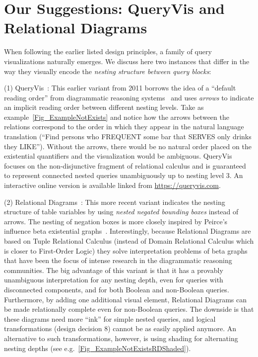 \documentclass[letterpaper,11pt]{article}
\newcommand{\queryvis}{\textsf{QueryVis}\xspace}
\newcommand{\diagrams}{\textsf{Relational Diagrams}\xspace}
\begin{document}
%
\section{Our Suggestions: \queryvis and \diagrams}

When following the earlier listed design principles, a family of query visualizations naturally emerges.
%
We discuss here two instances that differ in the way they visually encode the \emph{nesting structure between query blocks}:

(1) \queryvis~\cite{DanaparamitaG2011:QueryViz,
gatterbauer2011databases,
DBLP:conf/sigmod/LeventidisZDGJR20}:
This earlier variant from 2011
%
%
%
borrows the idea of a ``default reading order''
from diagrammatic reasoning systems~\cite{DBLP:conf/diagrams/FishH04} 
and uses \emph{arrows} to indicate an implicit reading order between different nesting levels.
Take as example~\autoref{Fig_ExampleNotExists} and notice how the arrows between the relations correspond to the order in which 
they appear in the natural language translation
(``Find persons who FREQUENT some bar that SERVES only drinks they LIKE''). 
Without the arrows, there would be no natural order placed on the existential quantifiers 
and the visualization would be ambiguous.
\queryvis focuses on the non-disjunctive fragment of relational calculus and is guaranteed to represent connected nested queries unambiguously up to nesting level 3.
An interactive online version is available linked from \url{https://queryvis.com}.



(2) \diagrams~\cite{relationalDiagrams}:
This more recent variant indicates the nesting structure of table variables by using \emph{nested negated bounding boxes} instead of arrows.
The nesting of negation boxes is more closely inspired by Peirce's influence beta existential graphs~\cite{peirce:1933,Roberts:1992,Shin:2002}.
%
%
Interestingly, because \diagrams are based on Tuple Relational Calculus (instead of Domain Relational Calculus which is closer to First-Order Logic)
they solve interpretation problems of beta graphs that have been the focus of intense research in the diagrammatic reasoning communities.
The big advantage of this variant is that it has a provably unambiguous interpretation for any nesting depth, 
even for queries with disconnected components,
and for both Boolean and non-Boolean queries.
Furthermore, by adding one additional visual element, \diagrams can be made relationally complete even for non-Boolean queries.
The downside is that these diagrams need more ``ink'' for simple nested queries, 
and logical transformations (design decision 8) cannot be as easily applied anymore.
An alternative to such transformations, however, is using shading for alternating nesting depths
(see e.g.\ \autoref{Fig_ExampleNotExistsRDShaded}).
\end{document}
